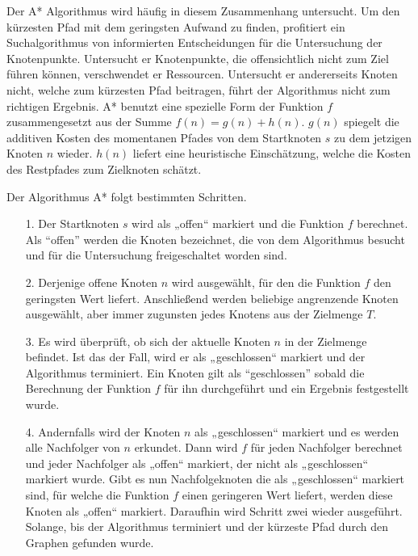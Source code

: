 Der A* Algorithmus wird häufig in diesem Zusammenhang untersucht. Um den kürzesten Pfad mit dem geringsten Aufwand zu finden, profitiert ein Suchalgorithmus von informierten Entscheidungen für die Untersuchung der Knotenpunkte. Untersucht er Knotenpunkte, die offensichtlich nicht zum Ziel führen können, verschwendet er Ressourcen. Untersucht er andererseits Knoten nicht, welche zum kürzesten Pfad beitragen, führt der Algorithmus nicht zum richtigen Ergebnis. %
A* benutzt eine spezielle Form der Funktion $f$ zusammengesetzt aus der Summe $f(n) = g(n) + h(n)$. $g(n)$ spiegelt die additiven Kosten des momentanen Pfades von dem Startknoten $s$ zu dem jetzigen Knoten $n$ wieder. $h(n)$ liefert eine heuristische Einschätzung, welche die Kosten des Restpfades zum Zielknoten schätzt\cite{RinaDechterandJudeaPearl.1983}. %


Der Algorithmus A* folgt bestimmten Schritten. 
\begin{itemize}
\item[1.] Der Startknoten $s$ wird als „offen“ markiert und die Funktion $f$ berechnet. Als “offen” werden die Knoten bezeichnet, die von dem Algorithmus besucht und für die Untersuchung freigeschaltet worden sind.
\item[2.] Derjenige offene Knoten $n$ wird ausgewählt, für den die Funktion $f$ %
den geringsten Wert liefert. Anschließend werden beliebige angrenzende Knoten ausgewählt, aber immer zugunsten jedes Knotens aus der Zielmenge $T$.
\item[3.] Es wird überprüft, ob sich der aktuelle Knoten $n$ in der Zielmenge befindet. Ist das der Fall, wird er als „geschlossen“ markiert und der Algorithmus terminiert. Ein Knoten gilt als “geschlossen” sobald die Berechnung der Funktion $f$ für ihn durchgeführt und ein Ergebnis festgestellt wurde. %
\item[4.] %
Andernfalls wird der Knoten $n$ als „geschlossen“ markiert und es werden alle Nachfolger von $n$ erkundet. Dann wird $f$ für jeden Nachfolger berechnet und jeder Nachfolger als „offen“ markiert, der nicht als „geschlossen“ markiert wurde. Gibt es nun Nachfolgeknoten die als „geschlossen“ markiert sind, für welche die Funktion $f$ einen geringeren Wert liefert, werden diese Knoten als „offen“ markiert. Daraufhin wird Schritt zwei wieder ausgeführt. Solange, bis der Algorithmus terminiert und der kürzeste Pfad durch den Graphen gefunden wurde\cite{HartNilssonandRaphael.1968}.
\end{itemize}


